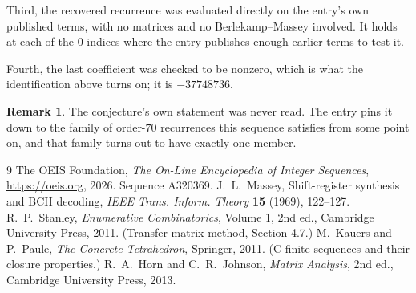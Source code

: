 \documentclass[11pt,a4paper]{article}
\theoremstyle{plain}
\theoremstyle{definition}
\newtheorem{remark}[theorem]{Remark}
\begin{document}
Third, the recovered recurrence was evaluated directly on the entry's own published terms, with
no matrices and no Berlekamp--Massey involved. It holds at each of the $0$ indices where
the entry publishes enough earlier terms to test it.

Fourth, the last coefficient was checked to be nonzero, which is what the identification above
turns on; it is $-37748736$.

\begin{remark}
The conjecture's own statement was never read. The entry pins it down to the family of
order-$70$ recurrences this sequence satisfies from some point on, and that family turns
out to have exactly one member.
\end{remark}

\begin{thebibliography}{9}
 The OEIS Foundation, \emph{The On-Line Encyclopedia of Integer
Sequences}, \url{https://oeis.org}, 2026. Sequence A320369.
 J.~L.~Massey, Shift-register synthesis and BCH decoding, \emph{IEEE
Trans. Inform. Theory} \textbf{15} (1969), 122--127.
 R.~P.~Stanley, \emph{Enumerative Combinatorics}, Volume 1, 2nd ed.,
Cambridge University Press, 2011. (Transfer-matrix method, Section 4.7.)
 M.~Kauers and P.~Paule, \emph{The Concrete Tetrahedron}, Springer, 2011.
(C-finite sequences and their closure properties.)
 R.~A.~Horn and C.~R.~Johnson, \emph{Matrix Analysis}, 2nd ed., Cambridge
University Press, 2013.
\end{thebibliography}
\end{document}
